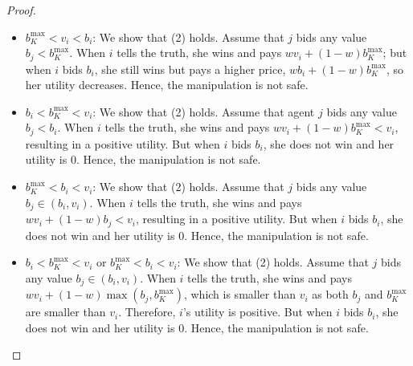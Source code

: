 \begin{proof}
\begin{itemize}
    
\item 
$b^{\max}_{K} < v_i < b_i$: We show that (2) holds.
Assume that $j$ bids any value $b_j < b^{\max}_{K}$.
When $i$ tells the truth, she wins and pays $w v_i + (1-w)b^{\max}_{K}$; 
but when $i$ bids $b_i$, she still wins but pays a higher price, $w b_i + (1-w)b^{\max}_{K}$, so her utility decreases.   
Hence, the manipulation is not safe.
    
\item 
$b_i < b^{\max}_{K} < v_i$: We show that (2) holds.
Assume that agent $j$ bids any value $b_j < b_i$.
When $i$ tells the truth, she wins and pays $w v_i + (1-w)b^{\max}_{K} < v_i$, resulting in a positive utility.
But when $i$ bids $b_i$, she does not win and her utility is $0$.
Hence, the manipulation is not safe.
    
\item 
$b^{\max}_{K} < b_i < v_i$: We show that (2) holds.
Assume that $j$ bids any value $b_j\in(b_i,v_i)$.
When $i$ tells the truth, she wins and pays $w v_i + (1-w)b_j < v_i$, resulting in a positive utility.
But when $i$ bids $b_i$, she does not win and her utility is $0$.
Hence, the manipulation is not safe.


\item 
$b_i < b^{\max}_{K} < v_i$ or $b^{\max}_{K} < b_i < v_i$:
We show that (2) holds. 
Assume that $j$ bids any value $b_j\in(b_i,v_i)$.
When $i$ tells the truth, she wins and pays $w v_i + (1-w)\max(b_j, b^{\max}_{K})$, which is smaller than $v_i$ as both $b_j$ and $b^{\max}_{K}$ are smaller than $v_i$. Therefore, $i$'s utility is positive.
But when $i$ bids $b_i$, she does not win and her utility is $0$.
Hence, the manipulation is not safe.
\end{itemize}
\end{proof}

